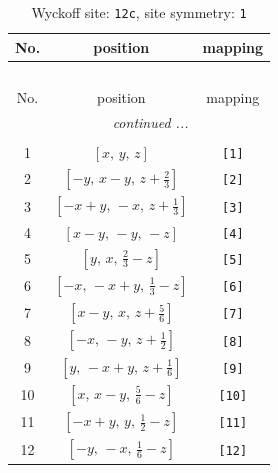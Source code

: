 \documentclass[fleqn,8pt]{jsarticle}
\begin{document}
\begin{longtable}{ccc}
\caption{Wyckoff site: {\tt 12c}, site symmetry: {\tt 1}}
 \\
 \hline \hline
No. & position & mapping \\ \hline \endfirsthead

\multicolumn{2}{l}{\tablename\ \thetable{}} \\
 \hline \hline
No. & position & mapping \\ \hline \endhead

 \hline \hline
\multicolumn{2}{r}{\footnotesize\it continued ...} \\ \endfoot

 \hline \hline
\multicolumn{2}{r}{} \\ \endlastfoot

1 & $\left[ x,\, y,\, z \right]$ & {\tt [1]} \\ \hline
2 & $\left[ - y,\, x - y,\, z + \frac{2}{3} \right]$ & {\tt [2]} \\ \hline
3 & $\left[ - x + y,\, - x,\, z + \frac{1}{3} \right]$ & {\tt [3]} \\ \hline
4 & $\left[ x - y,\, - y,\, - z \right]$ & {\tt [4]} \\ \hline
5 & $\left[ y,\, x,\, \frac{2}{3} - z \right]$ & {\tt [5]} \\ \hline
6 & $\left[ - x,\, - x + y,\, \frac{1}{3} - z \right]$ & {\tt [6]} \\ \hline
7 & $\left[ x - y,\, x,\, z + \frac{5}{6} \right]$ & {\tt [7]} \\ \hline
8 & $\left[ - x,\, - y,\, z + \frac{1}{2} \right]$ & {\tt [8]} \\ \hline
9 & $\left[ y,\, - x + y,\, z + \frac{1}{6} \right]$ & {\tt [9]} \\ \hline
10 & $\left[ x,\, x - y,\, \frac{5}{6} - z \right]$ & {\tt [10]} \\ \hline
11 & $\left[ - x + y,\, y,\, \frac{1}{2} - z \right]$ & {\tt [11]} \\ \hline
12 & $\left[ - y,\, - x,\, \frac{1}{6} - z \right]$ & {\tt [12]} \\
\end{longtable}
\end{document}
